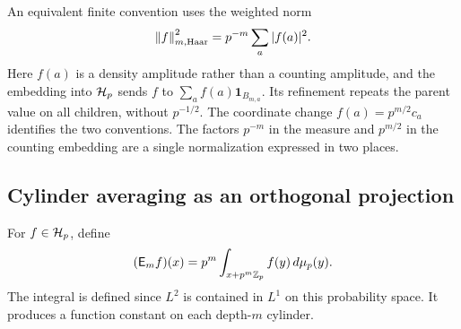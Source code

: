 An equivalent finite convention uses the weighted norm
\[
 \left\lVert f\right\rVert_{m,\mathrm{Haar}}^2=p^{-m}\sum_a|f(a)|^2.
\]
Here $f(a)$ is a density amplitude rather than a counting amplitude, and
the embedding into $\mathcal H_p$ sends $f$ to
$\sum_a f(a)\mathbf1_{B_{m,a}}$. Its refinement repeats the parent value
on all children, without $p^{-1/2}$. The coordinate change
$f(a)=p^{m/2}c_a$ identifies the two conventions. The factors
$p^{-m}$ in the measure and $p^{m/2}$ in the counting embedding are a
single normalization expressed in two places.

\subsection{Cylinder averaging as an orthogonal projection}

For $f\in\mathcal H_p$, define
\begin{equation}
 (\mathsf E_m f)(x)
 =p^m\int_{x+p^m\mathbb Z_p} f(y)\,d\mu_p(y).
 \label{a-limit-expectation}
\end{equation}
The integral is defined since $L^2$ is contained in $L^1$ on this
probability space. It produces a function constant on each depth-$m$
cylinder.

